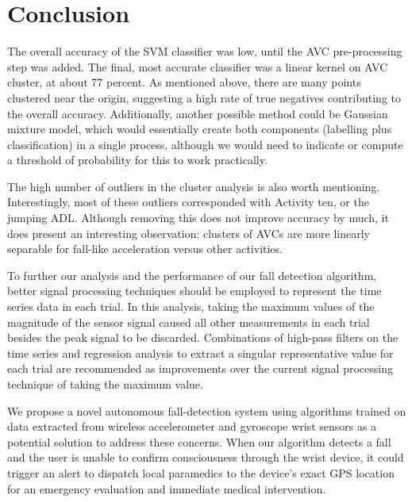 \documentclass{llncs}
\begin{document}
\section{Conclusion}

The overall accuracy of the SVM classifier was low, until the AVC pre-processing step was added. The final, most accurate classifier was a linear kernel on AVC cluster, at about 77 percent. As mentioned above, there are many points clustered near the origin, suggesting a high rate of true negatives contributing to the overall accuracy. Additionally, another possible method could be Gaussian mixture model, which would essentially create both components (labelling plus classification) in a single process, although we would need to indicate or compute a threshold of probability for this to work practically.

The high number of outliers in the cluster analysis is also worth mentioning. Interestingly, most of these outliers corresponded with Activity ten, or the jumping ADL. Although removing this does not improve accuracy by much, it does present an interesting observation: clusters of AVCs are more linearly separable for fall-like acceleration versus other activities.  

To further our analysis and the performance of our fall detection algorithm, better signal processing techniques should be employed to represent the time series data in each trial. In this analysis, taking the maximum values of the magnitude of the sensor signal caused all other measurements in each trial besides the peak signal to be discarded. Combinations of high-pass filters on the time series and regression analysis to extract a singular representative value for each trial are recommended as improvements over the current signal processing technique of taking the maximum value. 

We propose a novel autonomous fall-detection system using algorithms trained on data extracted from wireless accelerometer and gyroscope wrist sensors as a potential solution to address these concerns. When our algorithm detects a fall and the user is unable to confirm consciousness through the wrist device, it could trigger an alert to dispatch local paramedics to the device's exact GPS location for an emergency evaluation and immediate medical intervention. %




%
%


 {}
 

\end{document}

